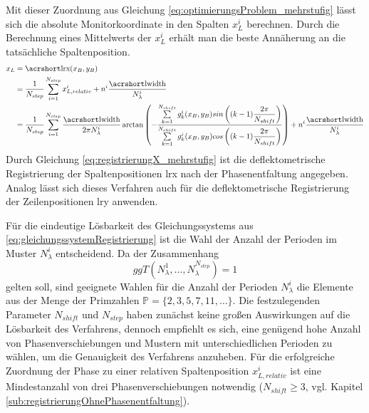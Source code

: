 \p
Mit dieser Zuordnung aus Gleichung \ref{eq:optimierungsProblem_mehrstufig} lässt sich die absolute Monitorkoordinate in den Spalten $x_L^i$ berechnen.
Durch die Berechnung eines Mittelwerts der $x_L^i$ erhält man die beste Annäherung an die tatsächliche Spaltenposition.
%
\begin{equation}\label{eq:registrierungX_mehrstufig}
	\begin{split}
		x_L
		& =
			\acrshortmath{lrx}(x_B, y_B)\\
		& =
			\dfrac{1}{N_{step}}
			\sum\limits_{i = 1}^{N_{step}}
			x_{L,relativ}^i + n^i \dfrac{\acrshortmath{lwidth}}{N_\lambda^i}\\
		& =
			\dfrac{1}{N_{step}}
			\sum\limits_{i = 1}^{N_{step}}
			\dfrac{\acrshortmath{lwidth}}{2\pi N_\lambda^i}
			\arctan
			\left(
				-\dfrac
				{\sum\limits_{k=1}^{N_{shift}} g_k^i(x_B, y_B) sin\left((k - 1)\dfrac{2\pi}{N_{shift}}\right)}
				{\sum\limits_{k=1}^{N_{shift}} g_k^i(x_B, y_B) cos\left((k - 1)\dfrac{2\pi}{N_{shift}}\right)}
			\right)
			+ n^i \dfrac{\acrshortmath{lwidth}}{N_\lambda^i}
	\end{split}
\end{equation}
%
Durch Gleichung \ref{eq:registrierungX_mehrstufig} ist die deflektometrische Registrierung der Spaltenpositionen \acrshort{lrx} nach der Phasenentfaltung angegeben.
Analog lässt sich dieses Verfahren auch für die deflektometrische Registrierung der Zeilenpositionen \acrshort{lry} anwenden.

\p
Für die eindeutige Lösbarkeit des Gleichungssystems aus \ref{eq:gleichungssystemRegistrierung} ist die Wahl der Anzahl der Perioden im Muster $N_\lambda^i$ entscheidend.
Da der Zusammenhang
%
\begin{equation*}
	ggT(N_\lambda^1, \ldots, N_\lambda^{N_{step}}) = 1
\end{equation*}
%
gelten soll, sind geeignete Wahlen für die Anzahl der Perioden $N_\lambda^i$ die Elemente aus der Menge der Primzahlen $\mathbb{P} = \lbrace 2, 3, 5, 7, 11,\ldots\rbrace$.
Die festzulegenden Parameter $N_{shift}$ und $N_{step}$ haben zunächst keine großen Auswirkungen auf die Lösbarkeit des Verfahrens, dennoch empfiehlt es sich, eine genügend hohe Anzahl von Phasenverschiebungen und Mustern mit unterschiedlichen Perioden zu wählen, um die Genauigkeit des Verfahrens anzuheben.
Für die erfolgreiche Zuordnung der Phase zu einer relativen Spaltenposition $x_{L,relativ}^i$ ist eine Mindestanzahl von drei Phasenverschiebungen notwendig ($N_{shift} \geq 3$, vgl. Kapitel \ref{sub:registrierungOhnePhasenentfaltung}). 

